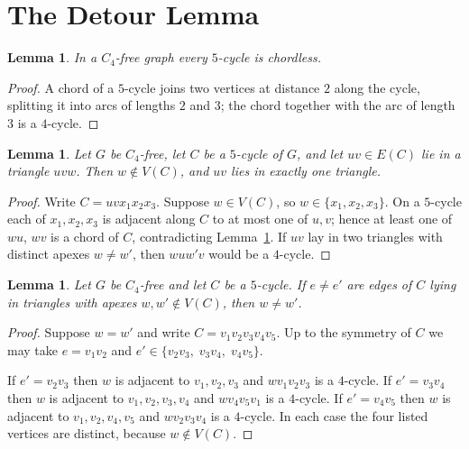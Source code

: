 \documentclass[11pt]{article}
\theoremstyle{plain}
\newtheorem{lemma}[theorem]{Lemma}
\theoremstyle{definition}
\newcommand{\Cfour}{C_4}
\begin{document}
\section{The Detour Lemma}

\begin{lemma}\label{lem:chordless}
In a $\Cfour$-free graph every $5$-cycle is chordless.
\end{lemma}

\begin{proof}
A chord of a $5$-cycle joins two vertices at distance $2$ along the cycle,
splitting it into arcs of lengths $2$ and $3$; the chord together with the arc of
length $3$ is a $4$-cycle.
\end{proof}

\begin{lemma}\label{lem:apex-off}
Let $G$ be $\Cfour$-free, let $C$ be a $5$-cycle of $G$, and let $uv\in E(C)$ lie
in a triangle $uvw$. Then $w\notin V(C)$, and $uv$ lies in exactly one triangle.
\end{lemma}

\begin{proof}
Write $C=uvx_1x_2x_3$. Suppose $w\in V(C)$, so $w\in\{x_1,x_2,x_3\}$. On a
$5$-cycle each of $x_1,x_2,x_3$ is adjacent along $C$ to at most one of $u,v$;
hence at least one of $wu$, $wv$ is a chord of $C$, contradicting
Lemma~\ref{lem:chordless}. If $uv$ lay in two triangles with distinct apexes
$w\ne w'$, then $w u w' v$ would be a $4$-cycle.
\end{proof}

\begin{lemma}\label{lem:apex-distinct}
Let $G$ be $\Cfour$-free and let $C$ be a $5$-cycle. If $e\ne e'$ are edges of
$C$ lying in triangles with apexes $w,w'\notin V(C)$, then $w\ne w'$.
\end{lemma}

\begin{proof}
Suppose $w=w'$ and write $C=v_1v_2v_3v_4v_5$. Up to the symmetry of $C$ we may
take $e=v_1v_2$ and $e'\in\{v_2v_3,\;v_3v_4,\;v_4v_5\}$.

If $e'=v_2v_3$ then $w$ is adjacent to $v_1,v_2,v_3$ and $w v_1 v_2 v_3$ is a
$4$-cycle. If $e'=v_3v_4$ then $w$ is adjacent to $v_1,v_2,v_3,v_4$ and
$w v_4 v_5 v_1$ is a $4$-cycle. If $e'=v_4v_5$ then $w$ is adjacent to
$v_1,v_2,v_4,v_5$ and $w v_2 v_3 v_4$ is a $4$-cycle. In each case the four
listed vertices are distinct, because $w\notin V(C)$.
\end{proof}
\end{document}
